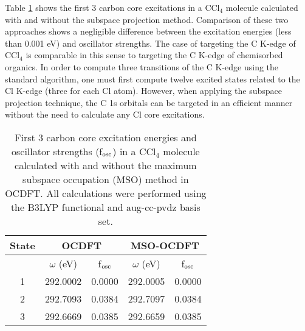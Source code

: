 \documentclass{article}
\begin{document}

Table \ref{tab:CCl4} shows the first 3 carbon core excitations in a CCl$_4$ molecule calculated with and without the subspace projection method. Comparison of these two approaches shows a negligible difference between the excitation energies (less than 0.001 eV) and oscillator strengths. The case of targeting the C K-edge of CCl$_4$ is comparable in this sense to targeting the C K-edge of chemisorbed organics. In order to compute three transitions of the C K-edge using the standard algorithm, one must first compute twelve excited states related to the Cl K-edge (three for each Cl atom). However, when applying the subspace projection technique, the C 1s orbitals can be targeted in an efficient manner without the need to calculate any Cl core excitations. 

\begin{table}
\centering
\footnotesize
\caption{First 3 carbon core excitation energies and oscillator strengths (f$_{\rm osc}$) in a CCl$_4$ molecule calculated with and without the maximum subspace occupation (MSO) method in OCDFT. All calculations were performed using the B3LYP functional and aug-cc-pvdz basis set.}
\begin{tabular}{ccccc}
\hline
\hline
State & \multicolumn{2}{c}{OCDFT}& \multicolumn{2}{c}{MSO-OCDFT}  \\
\hline 
& $\omega$ (eV) & f$_{\rm osc}$ & $\omega$ (eV) & f$_{\rm osc}$ \\
\hline 
1 & 292.0002 & 0.0000 & 292.0005 & 0.0000\\
2 & 292.7093 & 0.0384 & 292.7097 & 0.0384 \\
3 & 292.6669 & 0.0385 & 292.6659 & 0.0385\\
\hline
\hline
\end{tabular}
\label{tab:CCl4}
\end{table}
\end{document}
